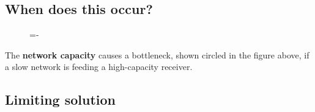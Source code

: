 \documentclass[a4paper]{systems-software}
\begin{document}
\subsection*{When does this occur?}

\begin{figure}[H]
	\lineskip=-\fboxrule
\end{figure}

The \textbf{network capacity} causes a bottleneck, shown circled in the figure above, if a slow network is feeding a high-capacity receiver.


\subsection*{Limiting solution}
\end{document}
